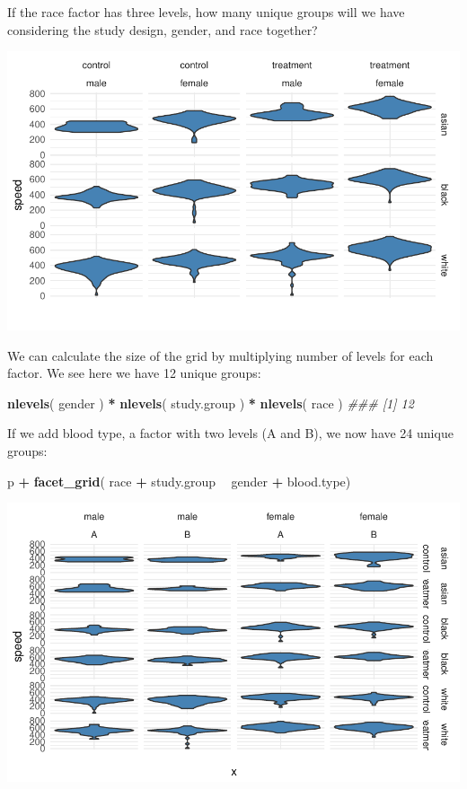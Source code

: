 \documentclass[]{book}
\newenvironment{Shaded}{\begin{snugshade}}{\end{snugshade}}
\newcommand{\CommentTok}[1]{\textcolor[rgb]{0.56,0.35,0.01}{\textit{#1}}}
\newcommand{\KeywordTok}[1]{\textcolor[rgb]{0.13,0.29,0.53}{\textbf{#1}}}
\newcommand{\NormalTok}[1]{#1}
\newcommand{\OperatorTok}[1]{\textcolor[rgb]{0.81,0.36,0.00}{\textbf{#1}}}
\newcommand{\StringTok}[1]{\textcolor[rgb]{0.31,0.60,0.02}{#1}}
\theoremstyle{definition}
\theoremstyle{definition}
\theoremstyle{definition}
\theoremstyle{remark}
\begin{document}
If the race factor has three levels, how many unique groups will we have
considering the study design, gender, and race together?

\begin{center}\includegraphics[width=0.7\linewidth]{DS4PS-I_files/figure-latex/unnamed-chunk-161-1} \end{center}

We can calculate the size of the grid by multiplying number of levels
for each factor. We see here we have 12 unique groups:

\begin{Shaded}
\begin{Highlighting}[]

\KeywordTok{nlevels}\NormalTok{( gender ) }\OperatorTok{*}\StringTok{ }\KeywordTok{nlevels}\NormalTok{( study.group ) }\OperatorTok{*}\StringTok{ }\KeywordTok{nlevels}\NormalTok{( race )}
\CommentTok{### [1] 12}
\end{Highlighting}
\end{Shaded}

If we add blood type, a factor with two levels (A and B), we now have 24
unique groups:

\begin{Shaded}
\begin{Highlighting}[]

\NormalTok{p }\OperatorTok{+}\StringTok{ }\KeywordTok{facet_grid}\NormalTok{( race }\OperatorTok{+}\StringTok{ }\NormalTok{study.group }\OperatorTok{~}\StringTok{ }\NormalTok{gender }\OperatorTok{+}\StringTok{ }\NormalTok{blood.type) }
\end{Highlighting}
\end{Shaded}

\begin{center}\includegraphics[width=0.7\linewidth]{DS4PS-I_files/figure-latex/unnamed-chunk-163-1} \end{center}
\end{document}
